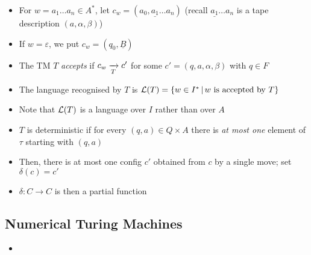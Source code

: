 \begin{itemize}
	
	\item For $ w = a_1 \dots a_n \in A^* $, let $ c_w = (a_0, \underline{a_1} \dots a_n) $ (recall $ \underline{a_1} \dots a_n $ is a tape description $ (a, \alpha, \beta) $)
	
	\item If $ w = \varepsilon $, we put $ c_w = (q_0, \underline{B}) $
	
	\item The TM $ T $ \textit{accepts} if $ c_w \xrightarrow[T]{} c' $ for some $ c' = (q, a, \alpha, \beta) $ with $ q \in F $
	
	\item The language recognised by $ T $ is $ \mathcal{L}(T) = \left\lbrace w \in I^* \, | \, w \text{ is accepted by } T  \right\rbrace $
	
	\item Note that $ \mathcal{L}(T) $ is a language over $ I $ rather than over $ A $
	
	\item $ T $ is deterministic if for every $ (q, a) \in Q \times A $ there is \textit{at most one} element of $ \tau $ starting with $ (q, a) $
	
	\item Then, there is at most one config $ c' $ obtained from $ c $ by a single move; set $ \delta(c) = c' $
	
	\item $ \delta: C \to C $ is then a partial function
	
\end{itemize}

\clearpage

\subsection{Numerical Turing Machines}

\begin{itemize}
	
	\item 
	
\end{itemize}
